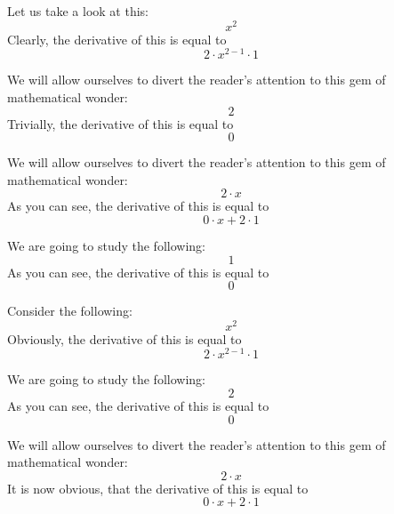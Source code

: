 \documentclass{article}
\begin{document}
Let us take a look at this:
\begin{equation}
x ^{2 } 
\end{equation}
Clearly, the derivative of this is equal to
\begin{equation}
2 \cdot x ^{2 - 1 } \cdot 1 
\end{equation}

We will allow ourselves to divert the reader's attention to this gem of mathematical wonder:
\begin{equation}
2 
\end{equation}
Trivially, the derivative of this is equal to
\begin{equation}
0 
\end{equation}

We will allow ourselves to divert the reader's attention to this gem of mathematical wonder:
\begin{equation}
2 \cdot x 
\end{equation}
As you can see, the derivative of this is equal to
\begin{equation}
0 \cdot x + 2 \cdot 1 
\end{equation}

We are going to study the following:
\begin{equation}
1 
\end{equation}
As you can see, the derivative of this is equal to
\begin{equation}
0 
\end{equation}

Consider the following:
\begin{equation}
x ^{2 } 
\end{equation}
Obviously, the derivative of this is equal to
\begin{equation}
2 \cdot x ^{2 - 1 } \cdot 1 
\end{equation}

We are going to study the following:
\begin{equation}
2 
\end{equation}
As you can see, the derivative of this is equal to
\begin{equation}
0 
\end{equation}

We will allow ourselves to divert the reader's attention to this gem of mathematical wonder:
\begin{equation}
2 \cdot x 
\end{equation}
It is now obvious, that the derivative of this is equal to
\begin{equation}
0 \cdot x + 2 \cdot 1 
\end{equation}
\end{document}
